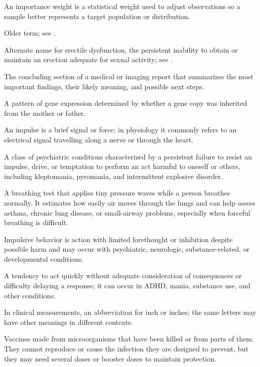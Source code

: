  An importance weight is a statistical weight used to adjust observations so a sample better represents a target population or distribution.

 Older term; see .

 Alternate name for erectile dysfunction, the persistent inability to obtain or maintain an erection adequate for sexual activity; see .

 The concluding section of a medical or imaging report that summarizes the most important findings, their likely meaning, and possible next steps.

 A pattern of gene expression determined by whether a gene copy was inherited from the mother or father.

 An impulse is a brief signal or force; in physiology it commonly refers to an electrical signal travelling along a nerve or through the heart.

 A class of psychiatric conditions characterized by a persistent failure to resist an impulse, drive, or temptation to perform an act harmful to oneself or others, including kleptomania, pyromania, and intermittent explosive disorder.

 A breathing test that applies tiny pressure waves while a person breathes normally. It estimates how easily air moves through the lungs and can help assess asthma, chronic lung disease, or small-airway problems, especially when forceful breathing is difficult.

 Impulsive behavior is action with limited forethought or inhibition despite possible harm and may occur with psychiatric, neurologic, substance-related, or developmental conditions.

 A tendency to act quickly without adequate consideration of consequences or difficulty delaying a response; it can occur in ADHD, mania, substance use, and other conditions.

 In clinical measurements, an abbreviation for inch or inches; the same letters may have other meanings in different contexts.

 Vaccines made from microorganisms that have been killed or from parts of them. They cannot reproduce or cause the infection they are designed to prevent, but they may need several doses or booster doses to maintain protection.

